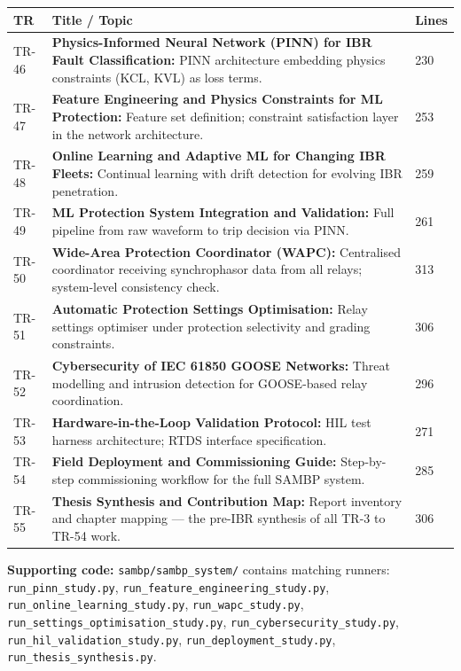 \documentclass[11pt,a4paper]{article}
\begin{document}
\begin{longtable}{lp{9.5cm}l}
\toprule
\textbf{TR} & \textbf{Title / Topic} & \textbf{Lines} \\
\midrule
\endhead
TR-46 & \textbf{Physics-Informed Neural Network (PINN) for IBR Fault Classification:} PINN architecture embedding physics constraints (KCL, KVL) as loss terms. & 230 \\[3pt]
TR-47 & \textbf{Feature Engineering and Physics Constraints for ML Protection:} Feature set definition; constraint satisfaction layer in the network architecture. & 253 \\[3pt]
TR-48 & \textbf{Online Learning and Adaptive ML for Changing IBR Fleets:} Continual learning with drift detection for evolving IBR penetration. & 259 \\[3pt]
TR-49 & \textbf{ML Protection System Integration and Validation:} Full pipeline from raw waveform to trip decision via PINN. & 261 \\[3pt]
TR-50 & \textbf{Wide-Area Protection Coordinator (WAPC):} Centralised coordinator receiving synchrophasor data from all relays; system-level consistency check. & 313 \\[3pt]
TR-51 & \textbf{Automatic Protection Settings Optimisation:} Relay settings optimiser under protection selectivity and grading constraints. & 306 \\[3pt]
TR-52 & \textbf{Cybersecurity of IEC 61850 GOOSE Networks:} Threat modelling and intrusion detection for GOOSE-based relay coordination. & 296 \\[3pt]
TR-53 & \textbf{Hardware-in-the-Loop Validation Protocol:} HIL test harness architecture; RTDS interface specification. & 271 \\[3pt]
TR-54 & \textbf{Field Deployment and Commissioning Guide:} Step-by-step commissioning workflow for the full SAMBP system. & 285 \\[3pt]
TR-55 & \textbf{Thesis Synthesis and Contribution Map:} Report inventory and chapter mapping — the pre-IBR synthesis of all TR-3 to TR-54 work. & 306 \\[3pt]
\bottomrule
\end{longtable}

\textbf{Supporting code:} \texttt{sambp/sambp\_system/} contains matching runners:
\texttt{run\_pinn\_study.py},
\texttt{run\_feature\_engineering\_study.py},
\texttt{run\_online\_learning\_study.py},
\texttt{run\_wapc\_study.py},
\texttt{run\_settings\_optimisation\_study.py},
\texttt{run\_cybersecurity\_study.py},
\texttt{run\_hil\_validation\_study.py},
\texttt{run\_deployment\_study.py},
\texttt{run\_thesis\_synthesis.py}.
\end{document}
